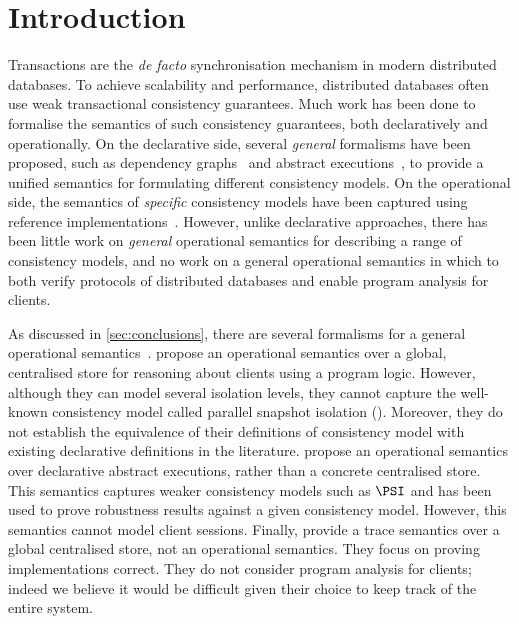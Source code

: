 \section{Introduction}
Transactions are the \emph{de facto} synchronisation mechanism in modern distributed databases.
To achieve scalability and performance, distributed databases  
often use weak transactional consistency guarantees. 
%
%
Much work has been done to formalise the semantics of such consistency guarantees, both
declaratively and operationally.
On the declarative side, several \emph{general} formalisms have been proposed, 
such as dependency graphs~\cite{adya} and abstract executions~\cite{framework-concur}, to provide a unified
semantics for formulating different consistency models.  
On the operational side, the semantics of \emph{specific} consistency models have
been captured using reference implementations~\cite{si,PSI,PSI-RA}. 
However, unlike declarative approaches, there has been
little work on \emph{general} operational semantics for describing a range
of consistency models, and no work on a general operational semantics
in which to both verify protocols of distributed databases and 
enable program analysis for clients.

As discussed in \cref{sec:conclusions}, there are several formalisms for a general operational semantics~\cite{sureshConcur,alonetogether,seebelieve}. 
\citeauthor{alonetogether} \cite{alonetogether} propose an operational
semantics over a global, centralised store  for reasoning about clients using a program logic. 
However, although they can model several isolation levels, they cannot
capture the well-known consistency model called 
parallel snapshot isolation (\PSI). 
Moreover, they do not establish the equivalence of their definitions
of consistency model
with existing declarative definitions in the literature. 
\citeauthor{sureshConcur} \cite{sureshConcur} propose an operational semantics over declarative abstract executions, rather than a concrete centralised store. This semantics captures weaker consistency models
such as \(\PSI\) and has been used to prove robustness results against
a given consistency model.  
However, this semantics cannot model client sessions.
Finally, \citeauthor{seebelieve} \cite{seebelieve} provide a trace semantics over a global
centralised store,  not an operational semantics. 
They focus on proving implementations correct. They do not consider program analysis for clients;
indeed we believe it would be difficult  given their choice to
keep track of the entire system.




